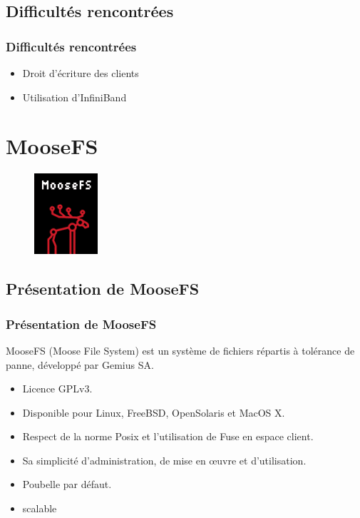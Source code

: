 \documentclass[blue]{beamer}
\begin{document}
	\subsection{Difficultés rencontrées}
	\begin{frame}
		\frametitle{Difficultés rencontrées}
			\begin{itemize}
				\item Droit d'écriture des clients
				\item Utilisation d'InfiniBand
			\end{itemize}
	\end{frame}


\section{MooseFS}
\begin{frame}
\begin{figure}
				\includegraphics[width=0.3\linewidth]{../images/moosefs.png}
			\end{figure}
\end{frame}
\subsection{Présentation de MooseFS}
\begin{frame}
		\frametitle{Présentation de MooseFS}
MooseFS (Moose File System) est un système de fichiers répartis à tolérance de panne, développé par Gemius SA.
		\begin{itemize}
			\item Licence GPLv3.
			\item Disponible pour Linux, FreeBSD, OpenSolaris et MacOS X.
			\item Respect de la norme Posix et l’utilisation de Fuse en espace client.
			\item Sa simplicité d’administration, de mise en œuvre et d'utilisation.
			\item Poubelle par défaut.
			\item scalable 
		\end{itemize}
	\end{frame}
	
\end{document}
